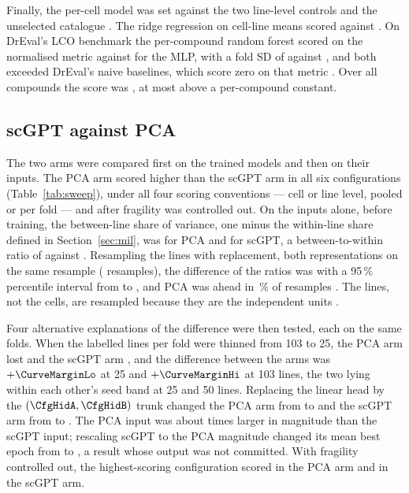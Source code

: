 Finally, the per-cell model was set against the two line-level controls and the unselected catalogue
\cite{hoerl1970,breiman2001}. The ridge regression on cell-line means scored \RidgePca{} against
\SpBest{}. On DrEval's LCO benchmark the per-compound random forest scored \DrRfNorm{} on the normalised
metric against \DrMlpNorm{} for the MLP, with a fold SD of \DrRfSd{} against \DrMlpSd{}, and both exceeded
DrEval's naive baselines, which score zero on that metric \cite{dreval}. Over all \NDrugsModelled{}
compounds the score was \SpAllDrugs{}, at most \NullGainMax{} above a per-compound constant.

\subsection{scGPT against PCA}
\label{sec:results-q2}

The two arms were compared first on the trained models and then on their inputs.
The PCA arm scored higher than the scGPT arm in all six configurations (Table~\ref{tab:sweep}), under
all four scoring conventions --- cell or line level, pooled or per fold
--- and after fragility was controlled out. On the inputs
alone, before training, the between-line share of variance, one minus the within-line share defined in
Section~\ref{sec:mil}, was \BtwSharePca{} for PCA and
\BtwShareScgpt{} for scGPT, a between-to-within ratio of \BtwRatioPca{} against \BtwRatioScgpt{}.
Resampling the \NLinesCV{} lines with replacement, both representations on the same resample
(\BtwBootB{} resamples), the difference of the ratios was \BtwRatioDiff{} with a 95\,\% percentile
interval from \BtwRatioDiffLo{} to \BtwRatioDiffHi{}, and PCA was ahead in \BtwBootPcaAheadPct\,\% of
resamples \cite{efron1993}. The lines, not the cells, are resampled because they are the independent
units \cite{lazic2010}.

Four alternative explanations of the difference were then tested, each on the same folds. When the labelled lines per fold were thinned from 103 to 25, the
PCA arm lost \CurveGainPca{} and the scGPT arm \CurveGainScgpt{}, and the difference between the arms was
$+\CurveMarginLo$ at 25 and $+\CurveMarginHi$ at 103 lines, the two lying within each other's seed band
at 25 and 50 lines. Replacing the linear head by the
$(\CfgHidA,\CfgHidB)$ trunk changed the PCA arm from \ArchLinPca{} to \ArchTrunkPca{} and the scGPT arm
from \ArchLinScgpt{} to \ArchTrunkScgpt{}. The PCA input was about
\InputScaleRatio{} times larger in magnitude than the scGPT input;
rescaling scGPT to the PCA magnitude changed its mean best epoch from \ScaleEpochNative{} to
\ScaleEpochScaled{}, a result whose output was not committed.
With fragility controlled out, the highest-scoring
configuration scored \FragBestPca{} in the PCA arm and \FragBestScgpt{} in the scGPT arm.

